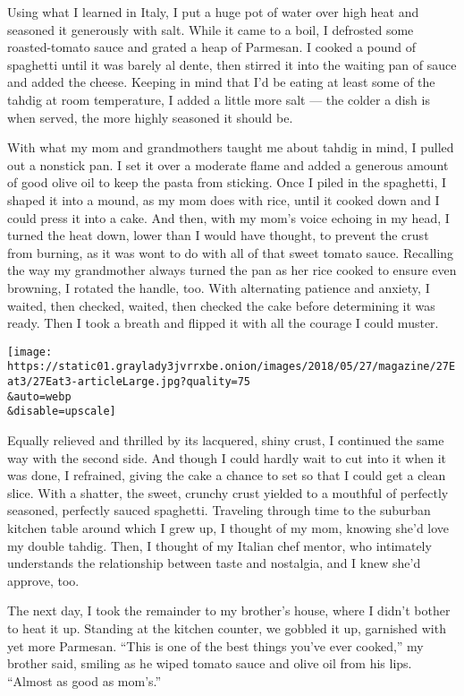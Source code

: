 Using what I learned in Italy, I put a huge pot of water over high heat
and seasoned it generously with salt. While it came to a boil, I
defrosted some roasted-tomato sauce and grated a heap of Parmesan. I
cooked a pound of spaghetti until it was barely al dente, then stirred
it into the waiting pan of sauce and added the cheese. Keeping in mind
that I'd be eating at least some of the tahdig at room temperature, I
added a little more salt --- the colder a dish is when served, the more
highly seasoned it should be.

With what my mom and grandmothers taught me about tahdig in mind, I
pulled out a nonstick pan. I set it over a moderate flame and added a
generous amount of good olive oil to keep the pasta from sticking. Once
I piled in the spaghetti, I shaped it into a mound, as my mom does with
rice, until it cooked down and I could press it into a cake. And then,
with my mom's voice echoing in my head, I turned the heat down, lower
than I would have thought, to prevent the crust from burning, as it was
wont to do with all of that sweet tomato sauce. Recalling the way my
grandmother always turned the pan as her rice cooked to ensure even
browning, I rotated the handle, too. With alternating patience and
anxiety, I waited, then checked, waited, then checked the cake before
determining it was ready. Then I took a breath and flipped it with all
the courage I could muster.

\texttt{[image: https://static01.graylady3jvrrxbe.onion/images/2018/05/27/magazine/27Eat3/27Eat3-articleLarge.jpg?quality=75\\\&auto=webp\\\&disable=upscale]}

Equally relieved and thrilled by its lacquered, shiny crust, I continued
the same way with the second side. And though I could hardly wait to cut
into it when it was done, I refrained, giving the cake a chance to set
so that I could get a clean slice. With a shatter, the sweet, crunchy
crust yielded to a mouthful of perfectly seasoned, perfectly sauced
spaghetti. Traveling through time to the suburban kitchen table around
which I grew up, I thought of my mom, knowing she'd love my double
tahdig. Then, I thought of my Italian chef mentor, who intimately
understands the relationship between taste and nostalgia, and I knew
she'd approve, too.

The next day, I took the remainder to my brother's house, where I didn't
bother to heat it up. Standing at the kitchen counter, we gobbled it up,
garnished with yet more Parmesan. ``This is one of the best things
you've ever cooked,'' my brother said, smiling as he wiped tomato sauce
and olive oil from his lips. ``Almost as good as mom's.''

